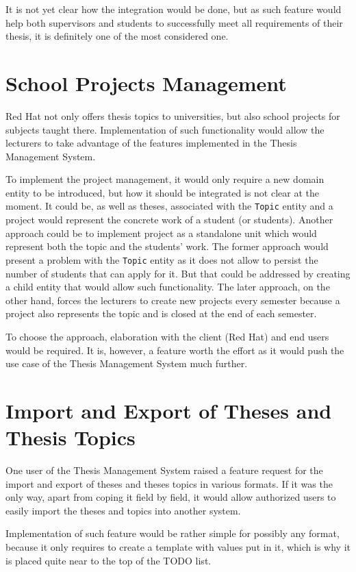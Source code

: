 It is not yet clear how the integration would be done, but as such feature would help both supervisors and students to successfully meet all requirements of their thesis, it is definitely one of the most considered one.

\section{School Projects Management}

Red Hat not only offers thesis topics to universities, but also school projects for subjects taught there. Implementation of such functionality would allow the lecturers to take advantage of the features implemented in the Thesis Management System.

To implement the project management, it would only require a new domain entity to be introduced, but how it should be integrated is not clear at the moment. It could be, as well as theses, associated with the \texttt{Topic} entity and a project would represent the concrete work of a student (or students). Another approach could be to implement project as a standalone unit which would represent both the topic and the students' work. The former approach would present a problem with the \texttt{Topic} entity as it does not allow to persist the number of students that can apply for it. But that could be addressed by creating a child entity that would allow such functionality. The later approach, on the other hand, forces the lecturers to create new projects every semester because a project also represents the topic and is closed at the end of each semester.

To choose the approach, elaboration with the client (Red Hat) and end users would be required. It is, however, a feature worth the effort as it would push the use case of the Thesis Management System much further.

\section{Import and Export of Theses and Thesis Topics}

One user of the Thesis Management System raised a feature request for the import and export of theses and theses topics in various formats. If it was the only way, apart from coping it field by field, it would allow authorized users to easily import the theses and topics into another system.

Implementation of such feature would be rather simple for possibly any format, because it only requires to create a template with values put in it, which is why it is placed quite near to the top of the TODO list.